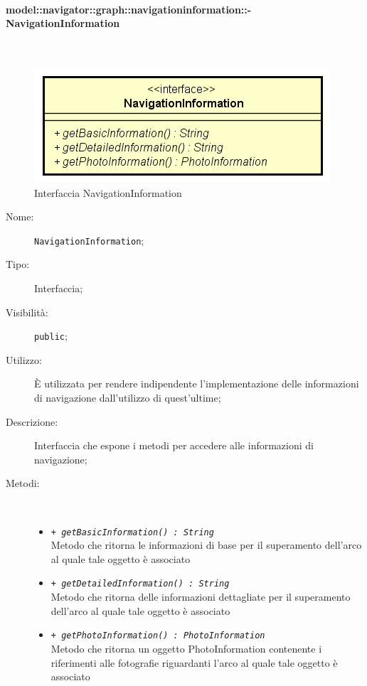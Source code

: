 \documentclass[../DefinizioneDiProdotto.tex]{subfiles}
\begin{document}
\paragraph{model::navigator::graph::navigationinformation::-\\NavigationInformation}
\
\begin{figure}[H]
	\centering
	\includegraphics[width=\maxwidth]{img/NavigationInformation.png}
	\caption{Interfaccia NavigationInformation}\label{fig:model::navigator::graph::navigationinformation::NavigationInformation} 
\end{figure}
\begin{description}
	\item[Nome:] \texttt{NavigationInformation};
	\item[Tipo:] Interfaccia;
	\item[Visibilità:] \texttt{public};
	\item[Utilizzo:] È utilizzata per rendere indipendente l'implementazione delle informazioni di navigazione dall'utilizzo di quest'ultime;
	\item[Descrizione:] Interfaccia che espone i metodi per accedere alle informazioni di navigazione;
	\item[Metodi:] \
	\begin{itemize}
		\item \texttt{+ \textit{getBasicInformation() : String}}\\
		Metodo che ritorna le informazioni di base per il superamento dell'arco al quale tale oggetto è associato
		\item \texttt{+ \textit{getDetailedInformation() : String}}\\
		Metodo che ritorna delle informazioni dettagliate per il superamento dell'arco al quale tale oggetto è associato
		\item \texttt{+ \textit{getPhotoInformation() : PhotoInformation}}\\
		Metodo che ritorna un oggetto PhotoInformation contenente i riferimenti alle fotografie riguardanti l'arco al quale tale oggetto è associato
	\end{itemize}
\end{description}
\end{document}
